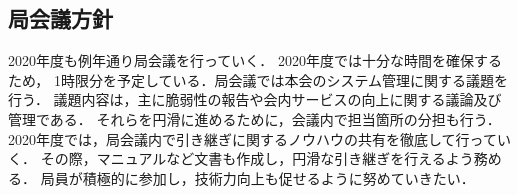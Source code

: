 \subsection*{局会議方針}


 2020年度も例年通り局会議を行っていく．
 2020年度では十分な時間を確保するため，
 1時限分を予定している．局会議では本会のシステム管理に関する議題を行う．
 議題内容は，主に脆弱性の報告や会内サービスの向上に関する議論及び管理である．
 それらを円滑に進めるために，会議内で担当箇所の分担も行う．
 2020年度では，局会議内で引き継ぎに関するノウハウの共有を徹底して行っていく．
 その際，マニュアルなど文書も作成し，円滑な引き継ぎを行えるよう務める．
 局員が積極的に参加し，技術力向上も促せるように努めていきたい．
